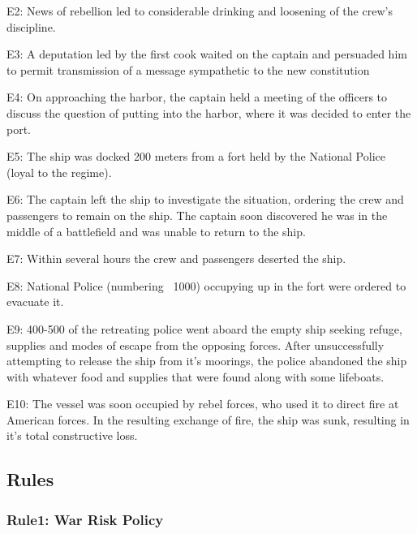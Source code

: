 E2: News of rebellion led to considerable drinking and loosening of the crew's discipline. 

E3: A deputation led by the first cook waited on the captain and persuaded him to permit transmission of a message sympathetic to the new constitution

E4: On approaching the harbor, the captain held a meeting of the officers to discuss the question of putting into the harbor, where it was decided to enter the port.

E5: The ship was docked 200 meters from a fort held by the National Police (loyal to the regime).

E6: The captain left the ship to investigate the situation, ordering the crew and passengers to remain on the ship. The captain soon discovered he was in the middle of a battlefield and was unable to return to the ship. 

E7: Within several hours the crew and passengers deserted the ship.

E8: National Police (numbering ~1000) occupying up in the fort were ordered to evacuate it.  

E9: 400-500 of the retreating police went aboard the empty ship seeking refuge, supplies and modes of escape from the opposing forces. After unsuccessfully attempting to release the ship from it's moorings, the police abandoned the ship with whatever food and supplies that were found along with some lifeboats.

E10: The vessel was soon occupied by rebel forces, who used it to direct fire at American forces. In the resulting exchange of fire, the ship was sunk, resulting in it's total constructive loss.


\subsection{Rules}

\subsubsection{Rule1: War Risk Policy} 

